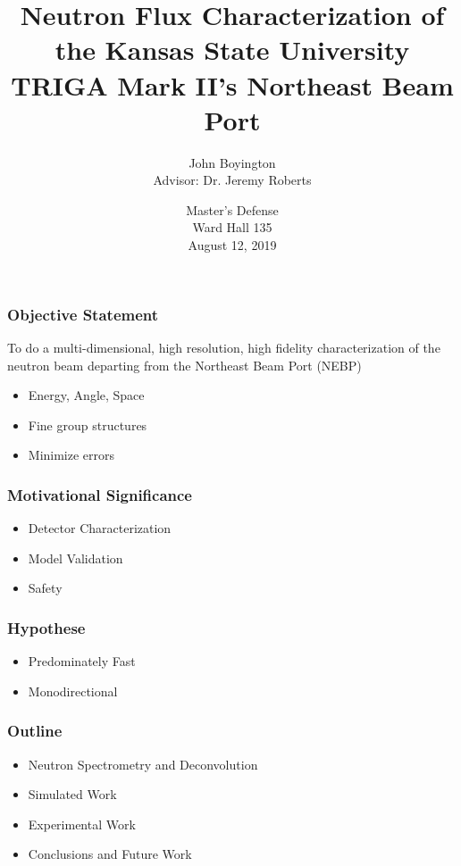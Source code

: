 \documentclass[fleqn]{beamer}
\title[KSU Beam Characterization]{Neutron Flux Characterization of the Kansas State University TRIGA Mark II's Northeast Beam Port}
\author[John Boyington]{
    John Boyington\\
    Advisor: Dr. Jeremy Roberts}
\institute[Kansas State University]{
    Department of Mechanical and Nuclear Engineering \\
    Kansas State University}
\date[Master's Defense]{
    Master's Defense\\
    Ward Hall 135\\
    August 12, 2019}
\begin{document}
\newcommand{\beginbackup}{
    \newcounter{framenumbervorappendix}
    \setcounter{framenumbervorappendix}{\value{framenumber}}
}
\newcommand{\backupend}{
    \addtocounter{framenumbervorappendix}{-\value{framenumber}}
    \addtocounter{framenumber}{\value{framenumbervorappendix}}
}



\begin{frame}
\titlepage
\end{frame}

\begin{frame}
\frametitle{Objective Statement}

To do a multi-dimensional, high resolution, high fidelity characterization of the neutron beam departing from the Northeast Beam Port (NEBP)
\begin{itemize}
\item Energy, Angle, Space
\item Fine group structures
\item Minimize errors
\end{itemize}

\end{frame}

\begin{frame}
\frametitle{Motivational Significance}

\begin{itemize}
\item Detector Characterization
\item Model Validation
\item Safety
\end{itemize}

\end{frame}

\begin{frame}
\frametitle{Hypothese}

\begin{itemize}
\item Predominately Fast
\item Monodirectional
\end{itemize}

\end{frame}

\begin{frame}
\frametitle{Outline}
\begin{itemize}
\item Neutron Spectrometry and Deconvolution
\item Simulated Work
\item Experimental Work
\item Conclusions and Future Work
\end{itemize}
\end{frame}
\end{document}
